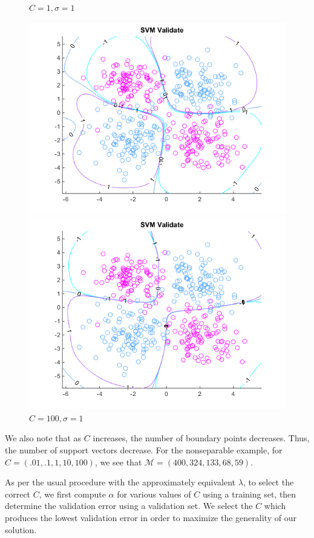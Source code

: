\documentclass[10pt,letterpaper]{article}
\begin{document}
\begin{center}
\begin{figure}[!htb]
  \caption{$C = 1, \sigma = 1$}
\endminipage
\end{figure}
\begin{figure}[!htb]
\hspace{.16\textwidth}
  \includegraphics[width=\linewidth]{figures/C10sigma1.png}
  \caption{$C = 10, \sigma = 1$}
\endminipage
{}
  \includegraphics[width=\linewidth]{figures/C100sigma1.png}
  \caption{$C = 100, \sigma = 1$}
\endminipage
\end{figure}
\end{center}

We also note that as $C$ increases, the number of boundary points decreases. Thus, the number of support vectors decrease. For the nonseparable example, for $C = (.01, .1, 1, 10, 100)$, we see that $\mathcal{M} = (400, 324, 133, 68, 59)$.

As per the usual procedure with the approximately equivalent $\lambda$, to select the correct $C$, we first compute $\alpha$ for various values of $C$ using a training set, then determine the validation error using a validation set. We select the $C$ which produces the lowest validation error in order to maximize the generality of our solution.
\end{document}

